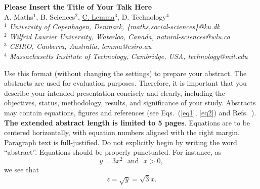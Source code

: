 \documentclass[11pt]{article}
\begin{document}
%
\vspace{-0.8cm}
\begin{flushleft}
\Large \textbf{\noindent
Please Insert the Title of Your Talk Here}
\\
\vspace{0.5cm}
\normalsize
\normalsize{
 A. Maths$^1$, B. Sciences$^2$, \underline{C. Lemma}$^3$, D. Technology$^4$
} \\
\vspace{5mm}
\textit{\footnotesize
$^1$ University of Copenhagen, Denmark,
\{maths,social-sciences\}@ku.dk\\
$^2$ Wilfrid Laurier University, Waterloo, Canada,
natural-sciences@wlu.ca\\
$^3$ CSIRO, Canberra, Australia,
lemma@csiro.au\\
$^4$ Massachusetts Institute of Technology, Cambridge, USA,
technology@mit.edu\\
}
\end{flushleft}

Use this format (without changing the settings) to prepare your  abstract. The abstracts are used for evaluation purposes. Therefore, it is important that you describe  your intended presentation concisely and clearly, including the objectives, status, methodology, results, and significance of your study.
 Abstracts may contain equations, figures and references (see Eqs.~(\ref{eq1}, \ref{eq2}) and Refs.~\cite{KR,WK,ABS}). {\bf The extended abstract length is limited to 5  pages}.  Equations are to be centered horizontally, with equation numbers aligned with the right margin.  Paragraph text is full-justified.  Do not explicitly begin by writing the word ``abstract''.  Equations should be properly punctuated.  For instance, as
\begin{equation}
y=3x^2\  \  \  \mbox{and}\  \  \  x>0, \label{eq1}
\end{equation}
we see that
\begin{equation}
z=\sqrt{y}=\sqrt{3}x. \label{eq2}
\end{equation}
\end{document}
